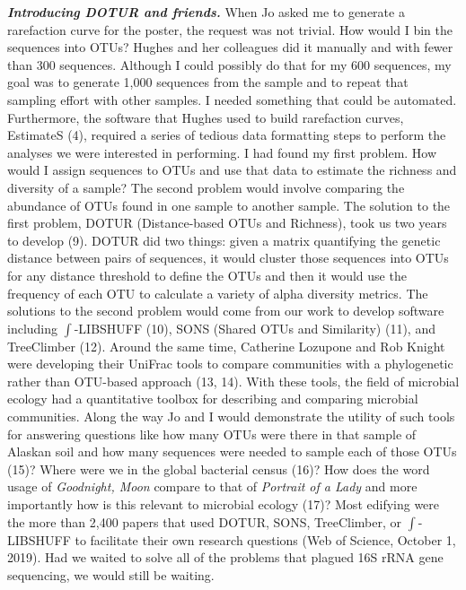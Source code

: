 \documentclass[11pt,]{article}
\begin{document}
\textbf{\emph{Introducing DOTUR and friends.}} When Jo asked me to
generate a rarefaction curve for the poster, the request was not
trivial. How would I bin the sequences into OTUs? Hughes and her
colleagues did it manually and with fewer than 300 sequences. Although I
could possibly do that for my 600 sequences, my goal was to generate
1,000 sequences from the sample and to repeat that sampling effort with
other samples. I needed something that could be automated. Furthermore,
the software that Hughes used to build rarefaction curves, EstimateS
(4), required a series of tedious data formatting steps to perform the
analyses we were interested in performing. I had found my first problem.
How would I assign sequences to OTUs and use that data to estimate the
richness and diversity of a sample? The second problem would involve
comparing the abundance of OTUs found in one sample to another sample.
The solution to the first problem, DOTUR (Distance-based OTUs and
Richness), took us two years to develop (9). DOTUR did two things: given
a matrix quantifying the genetic distance between pairs of sequences, it
would cluster those sequences into OTUs for any distance threshold to
define the OTUs and then it would use the frequency of each OTU to
calculate a variety of alpha diversity metrics. The solutions to the
second problem would come from our work to develop software including
\(\int\)-LIBSHUFF (10), SONS (Shared OTUs and Similarity) (11), and
TreeClimber (12). Around the same time, Catherine Lozupone and Rob
Knight were developing their UniFrac tools to compare communities with a
phylogenetic rather than OTU-based approach (13, 14). With these tools,
the field of microbial ecology had a quantitative toolbox for describing
and comparing microbial communities. Along the way Jo and I would
demonstrate the utility of such tools for answering questions like how
many OTUs were there in that sample of Alaskan soil and how many
sequences were needed to sample each of those OTUs (15)? Where were we
in the global bacterial census (16)? How does the word usage of
\emph{Goodnight, Moon} compare to that of \emph{Portrait of a Lady} and
more importantly how is this relevant to microbial ecology (17)? Most
edifying were the more than 2,400 papers that used DOTUR, SONS,
TreeClimber, or \(\int\)-LIBSHUFF to facilitate their own research
questions (Web of Science, October 1, 2019). Had we waited to solve all
of the problems that plagued 16S rRNA gene sequencing, we would still be
waiting.
\end{document}

